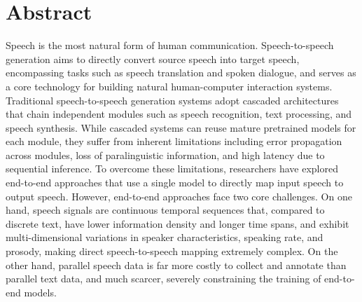 \intobmk\chapter*{Abstract}%

Speech is the most natural form of human communication. Speech-to-speech generation aims to directly convert source speech into target speech, encompassing tasks such as speech translation and spoken dialogue, and serves as a core technology for building natural human-computer interaction systems. Traditional speech-to-speech generation systems adopt cascaded architectures that chain independent modules such as speech recognition, text processing, and speech synthesis. While cascaded systems can reuse mature pretrained models for each module, they suffer from inherent limitations including error propagation across modules, loss of paralinguistic information, and high latency due to sequential inference. To overcome these limitations, researchers have explored end-to-end approaches that use a single model to directly map input speech to output speech. However, end-to-end approaches face two core challenges. On one hand, speech signals are continuous temporal sequences that, compared to discrete text, have lower information density and longer time spans, and exhibit multi-dimensional variations in speaker characteristics, speaking rate, and prosody, making direct speech-to-speech mapping extremely complex. On the other hand, parallel speech data is far more costly to collect and annotate than parallel text data, and much scarcer, severely constraining the training of end-to-end models.

